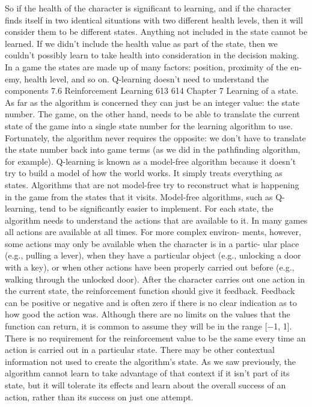 \documentclass[a4paper,oneside]{report}
\begin{document}
So if the health of the character is significant to learning, and if the character finds itself in two identical situations with two different health levels, then it will consider them to be different states. Anything not included in the state cannot be learned. If we didn’t include the health value as part of the state, then we couldn’t possibly learn to take health into consideration in the decision making.
In a game the states are made up of many factors: position, proximity of the en- emy, health level, and so on. Q-learning doesn’t need to understand the components
7.6 Reinforcement Learning 613
614 Chapter 7 Learning
of a state. As far as the algorithm is concerned they can just be an integer value: the state number.
The game, on the other hand, needs to be able to translate the current state of the game into a single state number for the learning algorithm to use. Fortunately, the algorithm never requires the opposite: we don’t have to translate the state number back into game terms (as we did in the pathfinding algorithm, for example).
Q-learning is known as a model-free algorithm because it doesn’t try to build a model of how the world works. It simply treats everything as states. Algorithms that are not model-free try to reconstruct what is happening in the game from the states that it visits. Model-free algorithms, such as Q-learning, tend to be significantly easier to implement.
For each state, the algorithm needs to understand the actions that are available to it. In many games all actions are available at all times. For more complex environ- ments, however, some actions may only be available when the character is in a partic- ular place (e.g., pulling a lever), when they have a particular object (e.g., unlocking a door with a key), or when other actions have been properly carried out before (e.g., walking through the unlocked door).
After the character carries out one action in the current state, the reinforcement function should give it feedback. Feedback can be positive or negative and is often zero if there is no clear indication as to how good the action was. Although there are no limits on the values that the function can return, it is common to assume they will be in the range [−1, 1].
There is no requirement for the reinforcement value to be the same every time an action is carried out in a particular state. There may be other contextual information not used to create the algorithm’s state. As we saw previously, the algorithm cannot learn to take advantage of that context if it isn’t part of its state, but it will tolerate its effects and learn about the overall success of an action, rather than its success on just one attempt.
\end{document}
